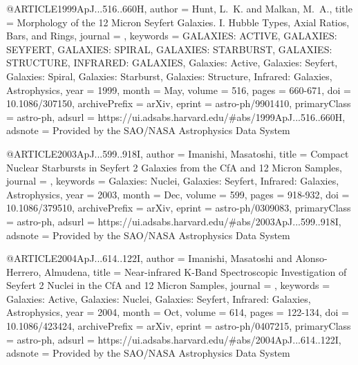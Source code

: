 \documentclass[longauth]{aa}
\begin{document}
{@ARTICLE{1999ApJ...516..660H,
       author = {{Hunt}, L.~K. and {Malkan}, M.~A.},
        title = {Morphology of the 12 Micron Seyfert Galaxies. I. Hubble Types, Axial Ratios, Bars, and Rings},
      journal = {\apj},
     keywords = {GALAXIES: ACTIVE, GALAXIES: SEYFERT, GALAXIES: SPIRAL, GALAXIES: STARBURST, GALAXIES: STRUCTURE, INFRARED: GALAXIES, Galaxies: Active, Galaxies: Seyfert, Galaxies: Spiral, Galaxies: Starburst, Galaxies: Structure, Infrared: Galaxies, Astrophysics},
         year = 1999,
        month = May,
       volume = {516},
        pages = {660-671},
          doi = {10.1086/307150},
archivePrefix = {arXiv},
       eprint = {astro-ph/9901410},
 primaryClass = {astro-ph},
       adsurl = {https://ui.adsabs.harvard.edu/#abs/1999ApJ...516..660H},
      adsnote = {Provided by the SAO/NASA Astrophysics Data System}
}

@ARTICLE{2003ApJ...599..918I,
       author = {{Imanishi}, Masatoshi},
        title = {Compact Nuclear Starbursts in Seyfert 2 Galaxies from the CfA and 12 Micron Samples},
      journal = {\apj},
     keywords = {Galaxies: Nuclei, Galaxies: Seyfert, Infrared: Galaxies, Astrophysics},
         year = 2003,
        month = Dec,
       volume = {599},
        pages = {918-932},
          doi = {10.1086/379510},
archivePrefix = {arXiv},
       eprint = {astro-ph/0309083},
 primaryClass = {astro-ph},
       adsurl = {https://ui.adsabs.harvard.edu/#abs/2003ApJ...599..918I},
      adsnote = {Provided by the SAO/NASA Astrophysics Data System}
}

@ARTICLE{2004ApJ...614..122I,
       author = {{Imanishi}, Masatoshi and {Alonso-Herrero}, Almudena},
        title = {Near-infrared K-Band Spectroscopic Investigation of Seyfert 2 Nuclei in the CfA and 12 Micron Samples},
      journal = {\apj},
     keywords = {Galaxies: Active, Galaxies: Nuclei, Galaxies: Seyfert, Infrared: Galaxies, Astrophysics},
         year = 2004,
        month = Oct,
       volume = {614},
        pages = {122-134},
          doi = {10.1086/423424},
archivePrefix = {arXiv},
       eprint = {astro-ph/0407215},
 primaryClass = {astro-ph},
       adsurl = {https://ui.adsabs.harvard.edu/#abs/2004ApJ...614..122I},
      adsnote = {Provided by the SAO/NASA Astrophysics Data System}
}

}
\end{document}
